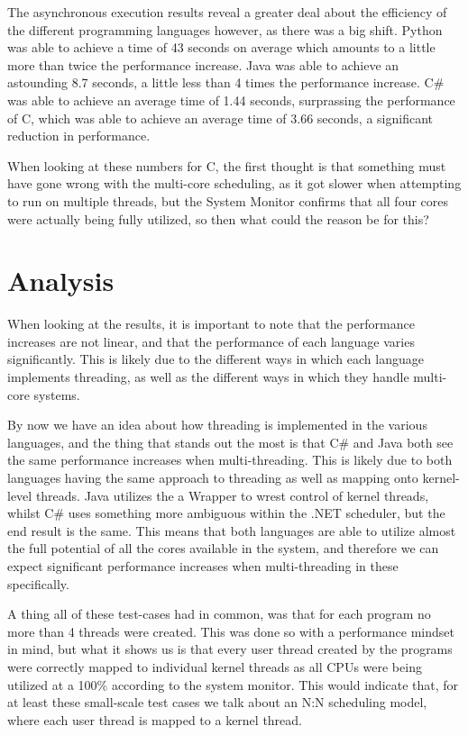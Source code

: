 \documentclass[12pt,a4paper]{article}
\begin{document}
The asynchronous execution results reveal a greater deal about the efficiency of the different programming languages however, as there was a big shift. Python was able to achieve a time of 43 seconds on average which amounts to a little more than twice the performance increase. Java was able to achieve an astounding 8.7 seconds, a little less than 4 times the performance increase. C\# was able to achieve an average time of 1.44 seconds, surprassing the performance of C, which was able to achieve an average time of 3.66 seconds, a significant reduction in performance.

When looking at these numbers for C, the first thought is that something must have gone wrong with the multi-core scheduling, as it got slower when attempting to run on multiple threads, but the System Monitor confirms that all four cores were actually being fully utilized, so then what could the reason be for this?

\section{Analysis}

When looking at the results, it is important to note that the performance increases are not linear, and that the performance of each language varies significantly. This is likely due to the different ways in which each language implements threading, as well as the different ways in which they handle multi-core systems.

By now we have an idea about how threading is implemented in the various languages, and the thing that stands out the most is that C\# and Java both see the same performance increases when multi-threading. This is likely due to both languages having the same approach to threading as well as mapping onto kernel-level threads. Java utilizes the a Wrapper to wrest control of kernel threads, whilst C\# uses something more ambiguous within the .NET scheduler, but the end result is the same. This means that both languages are able to utilize almost the full potential of all the cores available in the system, and therefore we can expect significant performance increases when multi-threading in these specifically. 

A thing all of these test-cases had in common, was that for each program no more than 4 threads were created. This was done so with a performance mindset in mind, but what it shows us is that every user thread created by the programs were correctly mapped to individual kernel threads as all CPUs were being utilized at a 100\% according to the system monitor. This would indicate that, for at least these small-scale test cases we talk about an N:N scheduling model, where each user thread is mapped to a kernel thread. 
\end{document}
